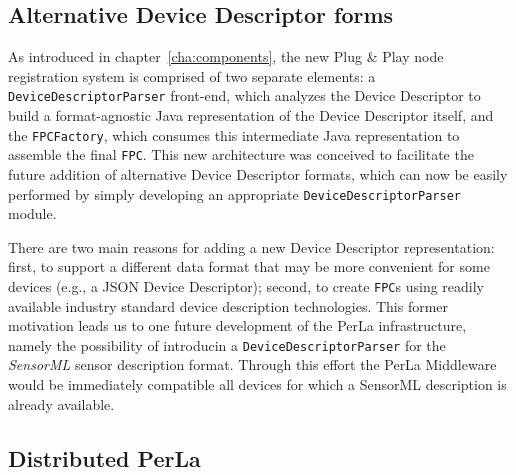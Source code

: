 \subsection{Alternative Device Descriptor forms}

As introduced in chapter~\ref{cha:components}, the new Plug \& Play node
registration system is comprised of two separate elements: a
\texttt{DeviceDescriptorParser} front-end, which analyzes the Device Descriptor
to build a format-agnostic Java representation of the Device Descriptor itself,
and the \texttt{FPCFactory}, which consumes this intermediate Java
representation to assemble the final \texttt{FPC}. This new architecture was
conceived to facilitate the future addition of alternative Device Descriptor
formats, which can now be easily performed by simply developing an appropriate
\texttt{DeviceDescriptorParser} module.

There are two main reasons for adding a new Device Descriptor representation:
first, to support a different data format that may be more convenient for some
devices (e.g., a JSON Device Descriptor); second, to create \texttt{FPC}s using
readily available industry standard device description technologies. This
former motivation leads us to one future development of the PerLa
infrastructure, namely the possibility of introducin a
\texttt{DeviceDescriptorParser} for the \textit{SensorML} \cite{sensorml}
sensor description format. Through this effort the PerLa Middleware would be
immediately compatible all devices for which a SensorML description is already
available.

\subsection{Distributed PerLa}
